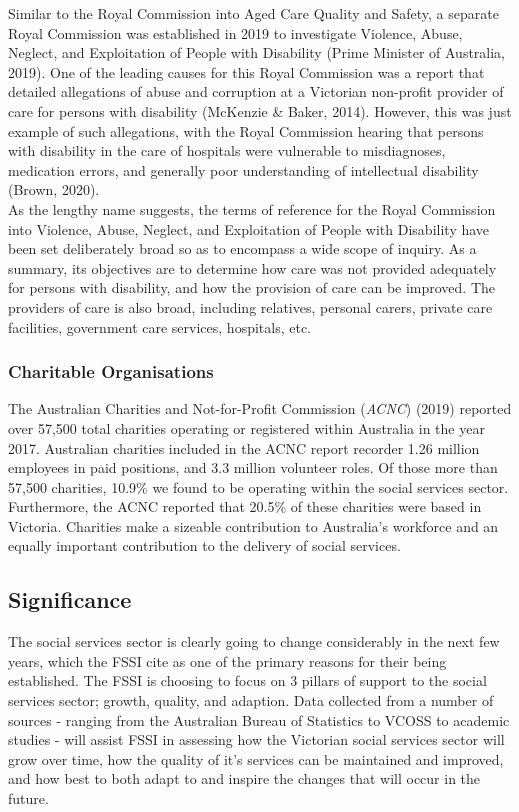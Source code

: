 \documentclass[11pt,]{article}
\begin{document}
Similar to the Royal Commission into Aged Care Quality and Safety, a
separate Royal Commission was established in 2019 to investigate
Violence, Abuse, Neglect, and Exploitation of People with Disability
(Prime Minister of Australia, 2019). One of the leading causes for this
Royal Commission was a report that detailed allegations of abuse and
corruption at a Victorian non-profit provider of care for persons with
disability (McKenzie \& Baker, 2014). However, this was just example of
such allegations, with the Royal Commission hearing that persons with
disability in the care of hospitals were vulnerable to misdiagnoses,
medication errors, and generally poor understanding of intellectual
disability (Brown, 2020).\\
As the lengthy name suggests, the terms of reference for the Royal
Commission into Violence, Abuse, Neglect, and Exploitation of People
with Disability have been set deliberately broad so as to encompass a
wide scope of inquiry. As a summary, its objectives are to determine how
care was not provided adequately for persons with disability, and how
the provision of care can be improved. The providers of care is also
broad, including relatives, personal carers, private care facilities,
government care services, hospitals, etc.

\subsubsection{Charitable Organisations}\label{charitable-organisations}

The Australian Charities and Not-for-Profit Commission (\emph{ACNC})
(2019) reported over 57,500 total charities operating or registered
within Australia in the year 2017. Australian charities included in the
ACNC report recorder 1.26 million employees in paid positions, and 3.3
million volunteer roles. Of those more than 57,500 charities, 10.9\% we
found to be operating within the social services sector. Furthermore,
the ACNC reported that 20.5\% of these charities were based in Victoria.
Charities make a sizeable contribution to Australia's workforce and an
equally important contribution to the delivery of social services.

\subsection{Significance}\label{significance}

The social services sector is clearly going to change considerably in
the next few years, which the FSSI cite as one of the primary reasons
for their being established. The FSSI is choosing to focus on 3 pillars
of support to the social services sector; growth, quality, and adaption.
Data collected from a number of sources - ranging from the Australian
Bureau of Statistics to VCOSS to academic studies - will assist FSSI in
assessing how the Victorian social services sector will grow over time,
how the quality of it's services can be maintained and improved, and how
best to both adapt to and inspire the changes that will occur in the
future.
\end{document}
